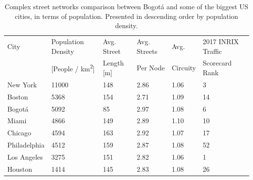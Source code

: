 \documentclass[runningheads]{llncs}
\begin{document}
\begin{table}
  \caption{Complex street networks comparison between Bogotá and some of the biggest US cities, in terms of population. Presented in descending order by population density.}\label{tab1}
  \begin{center}
  \begin{tabular}{|l|l|l|l|l|l|}
    \hline
    City & Population Density & Avg. Street & Avg. Streets & Avg. & 2017 INRIX Traffic \\
     & [People / km\textsuperscript{2}] & Length [m] & Per Node & Circuity & Scorecard Rank \\
    \hline
    New York & 11000 & 148 & 2.86 & 1.06 & 3 \\
    Boston & 5368 & 154 & 2.71 & 1.09 & 14 \\
    Bogotá & 5092 & 85 & 2.97 & 1.08 & 6 \\
    Miami & 4866 & 149 & 2.89 & 1.10 & 10 \\
    Chicago & 4594 & 163 & 2.92 & 1.07 & 17 \\
    Philadelphia & 4512 & 159 & 2.87 & 1.08 & 52 \\
    Los Angeles & 3275 & 151 & 2.82 & 1.06 & 1 \\
    Houston & 1414 & 145 & 2.83 & 1.08 & 26 \\
    \hline
  \end{tabular}
  \end{center}
\end{table}
\end{document}
